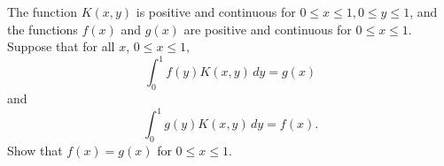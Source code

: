 The function $K(x,y)$ is positive and continuous for $0 \leq x \leq 1, 0
\leq y \leq 1$, and the functions $f(x)$ and $g(x)$ are positive and
continuous for $0 \leq x \leq 1$. Suppose that for all $x$, $0 \leq x \leq 1$,
\[
\int_0^1 f(y)K(x,y)\,dy = g(x)
\]
and
\[
\int_0^1 g(y)K(x,y)\,dy = f(x).
\]
Show that $f(x) = g(x)$ for $0 \leq x \leq 1$.
